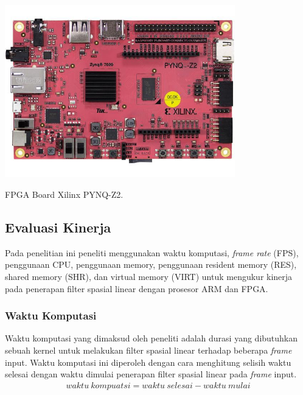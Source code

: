 \begin{afigure}
    \includegraphics[width=10cm, center]{images/pynq-z2.jpeg}
    \caption{FPGA Board Xilinx PYNQ-Z2.}
    \label{fig:pynq-z2}
\end{afigure}


\subsection{Evaluasi Kinerja}
Pada penelitian ini peneliti menggunakan waktu komputasi, \textit{frame rate} (FPS), penggunaan CPU, penggunaan {memory}, penggunaan {resident memory} (RES), {shared memory} (SHR), dan {virtual memory} (VIRT) untuk mengukur kinerja pada penerapan filter spasial linear dengan prosesor ARM dan FPGA.

\subsubsection{Waktu Komputasi}
Waktu komputasi yang dimaksud oleh peneliti adalah durasi yang dibutuhkan sebuah kernel untuk melakukan filter spasial linear terhadap beberapa \textit{frame} input. Waktu komputasi ini diperoleh dengan cara menghitung selisih waktu selesai dengan waktu dimulai penerapan filter spasial linear pada \textit{frame} input.
\begin{equation}
    \label{eq:time}
    \begin{split}
waktu\ kompuatsi = waktu\ selesai - waktu\ mulai
    \end{split}
\end{equation}

